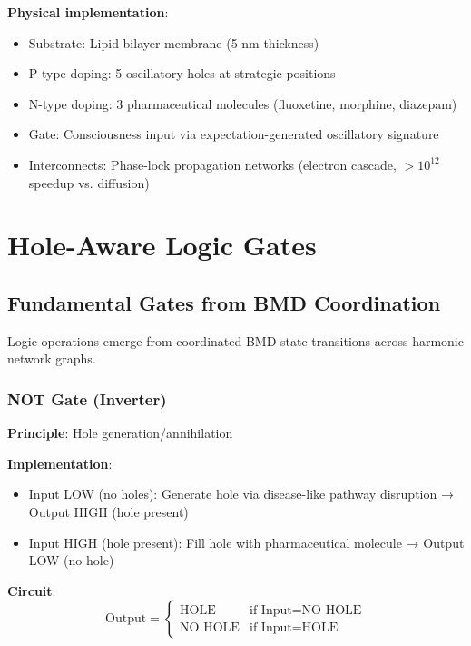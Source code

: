 \documentclass[11pt,a4paper]{article}
\begin{document}
\textbf{Physical implementation}:
\begin{itemize}
\item Substrate: Lipid bilayer membrane (5 nm thickness)
\item P-type doping: 5 oscillatory holes at strategic positions
\item N-type doping: 3 pharmaceutical molecules (fluoxetine, morphine, diazepam)
\item Gate: Consciousness input via expectation-generated oscillatory signature
\item Interconnects: Phase-lock propagation networks (electron cascade, $>10^{12}$ speedup vs. diffusion)
\end{itemize}

\section{Hole-Aware Logic Gates}

\subsection{Fundamental Gates from BMD Coordination}

Logic operations emerge from coordinated BMD state transitions across harmonic network graphs.

\subsubsection{NOT Gate (Inverter)}

\textbf{Principle}: Hole generation/annihilation

\textbf{Implementation}:
\begin{itemize}
\item Input LOW (no holes): Generate hole via disease-like pathway disruption → Output HIGH (hole present)
\item Input HIGH (hole present): Fill hole with pharmaceutical molecule → Output LOW (no hole)
\end{itemize}

\textbf{Circuit}:
\begin{equation}
\text{Output} = \begin{cases}
\text{HOLE} & \text{if Input} = \text{NO HOLE} \\
\text{NO HOLE} & \text{if Input} = \text{HOLE}
\end{cases}
\end{equation}
\end{document}
